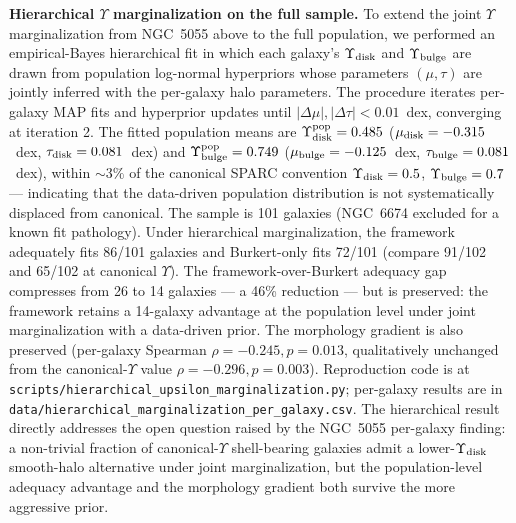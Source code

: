 \documentclass[linenumbers]{aastex701}
\newcommand{\Yt}{\Upsilon}
\newcommand{\Ydisk}{\Upsilon_{\rm disk}}
\newcommand{\Ybulge}{\Upsilon_{\rm bulge}}
\begin{document}
\textbf{Hierarchical $\Yt$ marginalization on the full sample.} To extend the joint $\Yt$ marginalization from NGC~5055 above to the full population, we performed an empirical-Bayes hierarchical fit in which each galaxy's $\Ydisk$ and $\Ybulge$ are drawn from population log-normal hyperpriors whose parameters $(\mu, \tau)$ are jointly inferred with the per-galaxy halo parameters. The procedure iterates per-galaxy MAP fits and hyperprior updates until $|\Delta\mu|, |\Delta\tau| < 0.01$~dex, converging at iteration 2. The fitted population means are $\Ydisk^{\rm pop} = 0.485$ ($\mu_{\rm disk} = -0.315$~dex, $\tau_{\rm disk} = 0.081$~dex) and $\Ybulge^{\rm pop} = 0.749$ ($\mu_{\rm bulge} = -0.125$~dex, $\tau_{\rm bulge} = 0.081$~dex), within $\sim 3\%$ of the canonical SPARC convention $\Ydisk = 0.5$, $\Ybulge = 0.7$ --- indicating that the data-driven population distribution is not systematically displaced from canonical. The sample is 101 galaxies (NGC~6674 excluded for a known fit pathology). Under hierarchical marginalization, the framework adequately fits 86/101 galaxies and Burkert-only fits 72/101 (compare 91/102 and 65/102 at canonical $\Yt$). The framework-over-Burkert adequacy gap compresses from 26 to 14 galaxies --- a 46\% reduction --- but is preserved: the framework retains a 14-galaxy advantage at the population level under joint marginalization with a data-driven prior. The morphology gradient is also preserved (per-galaxy Spearman $\rho = -0.245, p = 0.013$, qualitatively unchanged from the canonical-$\Yt$ value $\rho = -0.296, p = 0.003$). Reproduction code is at \texttt{scripts/hierarchical\_upsilon\_marginalization.py}; per-galaxy results are in \texttt{data/hierarchical\_marginalization\_per\_galaxy.csv}. The hierarchical result directly addresses the open question raised by the NGC~5055 per-galaxy finding: a non-trivial fraction of canonical-$\Yt$ shell-bearing galaxies admit a lower-$\Ydisk$ smooth-halo alternative under joint marginalization, but the population-level adequacy advantage and the morphology gradient both survive the more aggressive prior.
\end{document}

